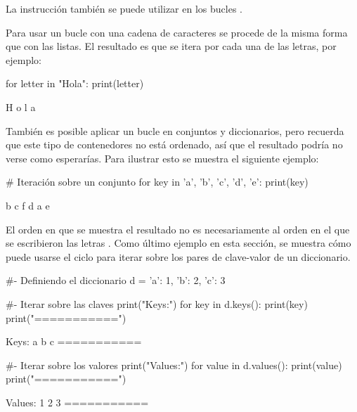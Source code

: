 La instrucción  también se puede utilizar en los bucles .

Para usar un bucle  con una cadena de caracteres se procede de la misma forma que con las listas. El resultado es que se itera por cada una de las letras, por ejemplo:

\begin{pyin}
for letter in "Hola":
    print(letter)
\end{pyin}
\begin{pyprint}
H
o
l
a
\end{pyprint}

También es posible aplicar un bucle  en conjuntos y diccionarios, pero recuerda que este tipo de contenedores no está ordenado, así que el resultado podría no verse como esperarías. Para ilustrar esto se muestra el siguiente ejemplo:

\begin{pyin}[]
# Iteración sobre un conjunto
for key in {'a', 'b', 'c', 'd', 'e'}:
    print(key)
\end{pyin}
\begin{pyprint}
b
c
f
d
a
e
\end{pyprint}

El orden en que se muestra el resultado no es necesariamente al orden en el que se escribieron las letras . Como último ejemplo en esta sección, se muestra cómo puede usarse el ciclo  para iterar sobre los pares de clave-valor de un diccionario.

\begin{pyin}[]
#- Definiendo el diccionario
d = {'a': 1, 'b': 2, 'c': 3}
\end{pyin}

\begin{pyin}[]
#- Iterar sobre las claves
print("Keys:")
for key in d.keys():
    print(key)
print("===========")
\end{pyin}
\begin{pyprint}
Keys:
a
b
c
===========
\end{pyprint}

\begin{pyin}[]
#- Iterar sobre los valores
print("Values:")
for value in d.values():
    print(value)
print("===========")
\end{pyin}
\begin{pyprint}
Values:
1
2
3
===========
\end{pyprint}

